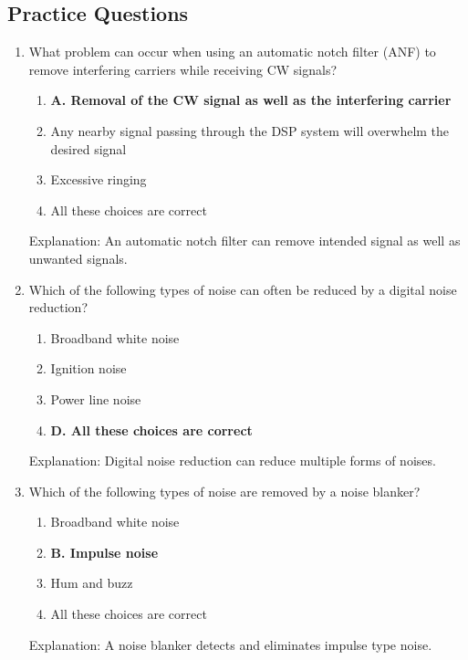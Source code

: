 \subsection*{Practice Questions}
\begin{enumerate}
   \item What problem can occur when using an automatic notch filter (ANF) to remove interfering carriers while receiving CW signals?
    \begin{enumerate}
        \item \textbf{A. Removal of the CW signal as well as the interfering carrier}
        \item  Any nearby signal passing through the DSP system will overwhelm the desired signal
        \item  Excessive ringing
       \item  All these choices are correct
    \end{enumerate}
      \textcolor{myred}{Explanation:}
    An automatic notch filter can remove intended signal as well as unwanted signals.
        
    \item Which of the following types of noise can often be reduced by a digital noise reduction?
       \begin{enumerate}
         \item  Broadband white noise
        \item  Ignition noise
      \item  Power line noise
         \item \textbf{D. All these choices are correct}
       \end{enumerate}
      \textcolor{myred}{Explanation:}
       Digital noise reduction can reduce multiple forms of noises.
       
   \item Which of the following types of noise are removed by a noise blanker?
    \begin{enumerate}
     \item  Broadband white noise
     \item \textbf{B. Impulse noise}
       \item  Hum and buzz
      \item  All these choices are correct
        \end{enumerate}
     \textcolor{myred}{Explanation:}
       A noise blanker detects and eliminates impulse type noise.
   

\end{enumerate}
